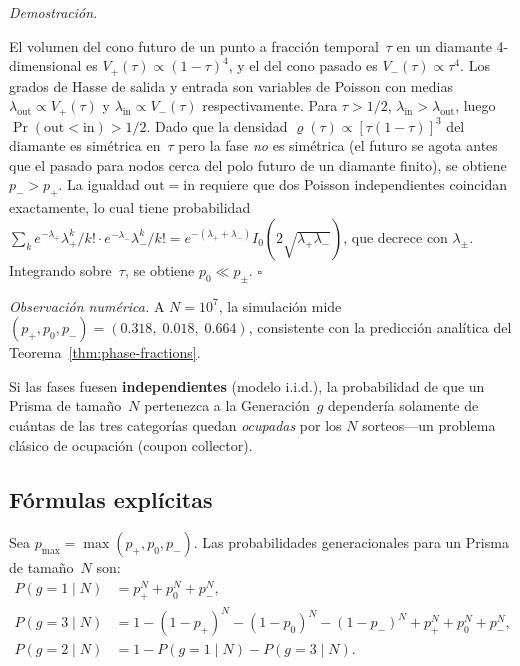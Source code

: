 \documentclass[11pt, a4paper, openany]{book}
\renewenvironment{proof}[1][Demostraci\'on]{%
  \par\noindent\textit{#1.}\quad
}{\hfill$\square$\par\medskip}
\begin{document}
\begin{proof}
El volumen del cono futuro de un punto a fracci\'on temporal~$\tau$ en
un diamante 4-dimensional es $V_+(\tau) \propto (1-\tau)^4$, y el del
cono pasado es $V_-(\tau) \propto \tau^4$. Los grados de Hasse de salida
y entrada son variables de Poisson con medias $\lambda_{\mathrm{out}}
\propto V_+(\tau)$ y $\lambda_{\mathrm{in}} \propto V_-(\tau)$
respectivamente. Para $\tau > 1/2$, $\lambda_{\mathrm{in}} >
\lambda_{\mathrm{out}}$, luego $\Pr(\mathrm{out} < \mathrm{in}) > 1/2$.
Dado que la densidad $\varrho(\tau) \propto [\tau(1-\tau)]^3$ del
diamante es sim\'etrica en~$\tau$ pero la fase \emph{no} es sim\'etrica
(el futuro se agota antes que el pasado para nodos cerca del polo futuro
de un diamante finito), se obtiene $p_- > p_+$.
La igualdad $\mathrm{out} = \mathrm{in}$ requiere que dos Poisson
independientes coincidan exactamente, lo cual tiene probabilidad
$\sum_k e^{-\lambda_+}\lambda_+^k/k!\cdot e^{-\lambda_-}\lambda_-^k/k!
= e^{-(\lambda_++\lambda_-)}I_0(2\sqrt{\lambda_+\lambda_-})$, que decrece
con $\lambda_\pm$. Integrando sobre~$\tau$, se obtiene $p_0 \ll p_\pm$.
\end{proof}

\noindent\textit{Observaci\'on num\'erica.}\enspace
A $N = 10^7$, la simulaci\'on mide
$(p_+, p_0, p_-) = (0{.}318,\; 0{.}018,\; 0{.}664)$,
consistente con la predicci\'on anal\'itica del
Teorema~\ref{thm:phase-fractions}.

\medskip
Si las fases fuesen \textbf{independientes} (modelo i.i.d.), la
probabilidad de que un Prisma de tama\~no~$N$ pertenezca a la
Generaci\'on~$g$ depender\'ia solamente de cu\'antas de las tres
categor\'ias quedan \emph{ocupadas} por los $N$ sorteos---un problema
cl\'asico de ocupaci\'on (coupon collector).

\subsection{F\'ormulas expl\'icitas}

Sea $p_{\max} = \max(p_+, p_0, p_-)$. Las probabilidades
generacionales para un Prisma de tama\~no~$N$ son:
\begin{align}
  P(g=1 \mid N) &= p_+^N + p_0^N + p_-^N, \\
  P(g=3 \mid N) &= 1 - (1-p_+)^N - (1-p_0)^N - (1-p_-)^N + p_+^N + p_0^N + p_-^N, \\
  P(g=2 \mid N) &= 1 - P(g=1 \mid N) - P(g=3 \mid N).
\end{align}
\end{document}

